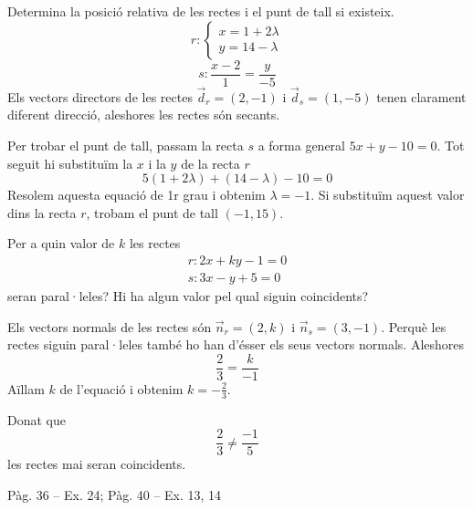 \documentclass[11pt, a4paper, pdf]{article}
\renewcommand{\hot}[1][]{
	\ifthenelse{\equal{#1}{}}{$\mathbf{\bigstar}$ \underline{\textbf{LLIBRE}}: }{\myrepeat{#1}{$\mathbf{\bigstar}$}}
}
\begin{document}
\begin{resolt}[E]{Determina la posició relativa de les rectes i el punt de tall si existeix.
		\begin{equation*}
		r: \left\{ \begin{array}{l} x=1+2\lambda \\ y= 14 - \lambda \end{array}\right.
		\end{equation*}	
		\begin{equation*}
		s: \frac{x-2}{1}=\frac{y}{-5}
		\end{equation*}	
	}
	Els vectors directors de les rectes $\vec d_r = (2,-1)$ i $\vec d_s = (1,-5)$ tenen clarament diferent direcció, aleshores les rectes són secants.
	
	Per trobar el punt de tall, passam la recta $s$ a forma general $5x+y-10=0$. Tot seguit hi substituïm la $x$ i la $y$ de la recta $r$
	\begin{equation*}
	5(1+2\lambda)+(14-\lambda)-10=0
	\end{equation*}	
	Resolem aquesta equació de 1r grau i obtenim $\lambda=-1$. Si substituïm aquest valor dins la recta $r$, trobam el punt de tall $(-1,15)$.
\end{resolt}
\vspace{-0.5cm}
\begin{resolt}[E]{Per a quin valor de $k$ les rectes 
		\begin{eqnarray*}
			r: 2x+ky-1=0 \\
			s: 3x-y+5=0
		\end{eqnarray*}	
		seran paral·leles? Hi ha algun valor pel qual siguin coincidents?}
	
	Els vectors normals de les rectes són $\vec n_r=(2,k)$ i $\vec n_s=(3,-1)$. Perquè les rectes siguin paral·leles també ho han d'ésser els seus vectors normals. Aleshores
	\begin{equation*}
	\frac{2}{3}=\frac{k}{-1}
	\end{equation*}	
	Aïllam $k$ de l'equació i obtenim $k=-\frac{2}{3}$.
	
	Donat que 
	\begin{equation*}
	\frac{2}{3}\neq \frac{-1}{5}
	\end{equation*}	
	les rectes mai seran coincidents.
\end{resolt}

\hot Pàg. 36 -- Ex. 24; Pàg. 40 -- Ex. 13, 14
\end{document}
